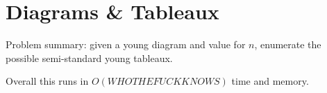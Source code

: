 \section{Diagrams \& Tableaux}

Problem summary: given a young diagram and value for $n$, enumerate the 
possible semi-standard young tableaux.

Overall this runs in $O(WHO THE FUCK KNOWS)$ time and memory.
